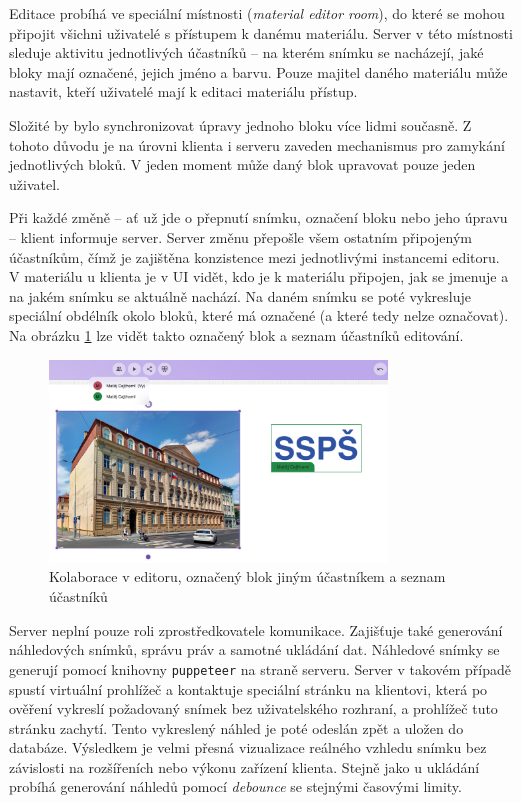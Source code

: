 Editace probíhá ve speciální místnosti (\textit{material editor room}), do které se mohou připojit všichni uživatelé s přístupem k danému materiálu. 
Server v této místnosti sleduje aktivitu jednotlivých účastníků -- na kterém snímku se nacházejí, jaké bloky mají označené, jejich jméno a barvu. 
Pouze majitel daného materiálu může nastavit, kteří uživatelé mají k editaci materiálu přístup.

Složité by bylo synchronizovat úpravy jednoho bloku více lidmi současně.
Z tohoto důvodu je na úrovni klienta i serveru zaveden mechanismus pro zamykání jednotlivých bloků.
V jeden moment může daný blok upravovat pouze jeden uživatel.

Při každé změně -- ať už jde o přepnutí snímku, označení bloku nebo jeho úpravu -- klient informuje server. 
Server změnu přepošle všem ostatním připojeným účastníkům, čímž je zajištěna konzistence mezi jednotlivými instancemi editoru.
V materiálu u klienta je v UI vidět, kdo je k materiálu připojen, jak se jmenuje a na jakém snímku se aktuálně nachází.
Na daném snímku se poté vykresluje speciální obdélník okolo bloků, které má označené (a které tedy nelze označovat).
Na obrázku \ref{fig:realizace/kolaborace} lze vidět takto označený blok a seznam účastníků editování.



\begin{figure}[ht!]
    \centering
    \includegraphics[width=0.8\textwidth]{media/05_realizace/kolaborace.png}
    \caption{Kolaborace v editoru, označený blok jiným účastníkem a seznam účastníků}
    \label{fig:realizace/kolaborace}
\end{figure}


Server neplní pouze roli zprostředkovatele komunikace. 
Zajišťuje také generování náhledových snímků, správu práv a samotné ukládání dat.
Náhledové snímky se generují pomocí knihovny \texttt{puppeteer} na straně serveru. 
Server v takovém případě spustí virtuální prohlížeč a kontaktuje speciální stránku na klientovi, která po ověření vykreslí požadovaný snímek bez uživatelského rozhraní, a prohlížeč tuto stránku zachytí. 
Tento vykreslený náhled je poté odeslán zpět a uložen do databáze. 
Výsledkem je velmi přesná vizualizace reálného vzhledu snímku bez závislosti na rozšířeních nebo výkonu zařízení klienta.
Stejně jako u ukládání probíhá generování náhledů pomocí \textit{debounce} se stejnými časovými limity.

